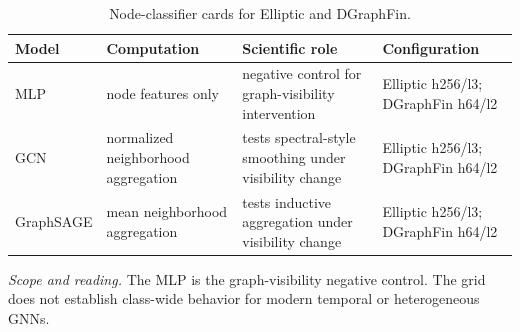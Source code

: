 \begin{table}[tbp]
\centering
\footnotesize
\setlength{\tabcolsep}{3.2pt}
\renewcommand{\arraystretch}{1.12}
\caption{Node-classifier cards for Elliptic and DGraphFin.}
\label{tab:s-node-models}
\begin{tabularx}{\textwidth}{@{}>{\raggedright\arraybackslash}p{} Y Y >{\raggedright\arraybackslash}p{0.22\textwidth}@{}}
\toprule
\textbf{Model} & \textbf{Computation} & \textbf{Scientific role} & \textbf{Configuration} \\
\midrule
MLP & node features only & negative control for graph-visibility intervention & Elliptic h256/l3; DGraphFin h64/l2 \\
GCN & normalized neighborhood aggregation & tests spectral-style smoothing under visibility change & Elliptic h256/l3; DGraphFin h64/l2 \\
GraphSAGE & mean neighborhood aggregation & tests inductive aggregation under visibility change & Elliptic h256/l3; DGraphFin h64/l2 \\
\bottomrule
\end{tabularx}
\vspace{2pt}
\begin{minipage}{\textwidth}\footnotesize\emph{Scope and reading.} The MLP is the graph-visibility negative control. The grid does not establish class-wide behavior for modern temporal or heterogeneous GNNs.\end{minipage}
\end{table}
